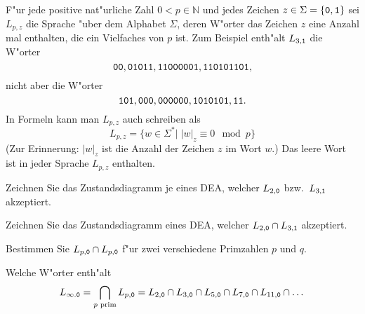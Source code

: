 F"ur jede positive nat"urliche Zahl $0<p\in\mathbb N$ und jedes Zeichen
$z\in \Sigma=\{\text{\tt 0},\text{\tt 1}\}$
sei $L_{p,z}$ die Sprache "uber dem Alphabet
$\Sigma$, deren W"orter das Zeichen $z$ eine Anzahl mal
enthalten, die ein Vielfaches von $p$ ist. Zum Beispiel enth"alt
$L_{3,\text{\tt 1}}$ die W"orter
\[
\text{\tt 00},
\text{\tt 01011},
\text{\tt 11000001},
\text{\tt 110101101},
\]
nicht aber die W"orter
\[
\text{\tt 101},
\text{\tt 000},
\text{\tt 000000},
\text{\tt 1010101},
\text{\tt 11}.
\]
In Formeln kann man $L_{p,z}$ auch schreiben als
\[
L_{p,z}=\{w\in\Sigma^*|\; |w|_z\equiv 0\mod p\}
\]
(Zur Erinnerung: $|w|_z$ ist die Anzahl der Zeichen $z$ im Wort $w$.)
Das leere Wort ist in jeder Sprache $L_{p,z}$ enthalten.
\begin{teilaufgaben}
\item Zeichnen Sie das Zustandsdiagramm je eines DEA, welcher
$L_{2,\text{\tt 0}}$ bzw.~$L_{3,\text{\tt 1}}$ akzeptiert.
\item Zeichnen Sie das Zustandsdiagramm eines DEA, welcher
$L_{2,\text{\tt 0}}\cap L_{3,\text{\tt 1}}$ akzeptiert.
\item
Bestimmen Sie
$L_{p,\text{\tt 0}} \cap L_{p,\text{\tt 0}}$
f"ur zwei verschiedene Primzahlen $p$ und $q$.
\item Welche W"orter enth"alt
\[
L_{\infty.\text{\tt 0}}
=
\bigcap_{\text{$p$ prim}}L_{p,\text{\tt 0}}
=
L_{2,\text{\tt 0}}\cap
L_{3,\text{\tt 0}}\cap
L_{5,\text{\tt 0}}\cap
L_{7,\text{\tt 0}}\cap
L_{11,\text{\tt 0}}\cap\dots
\]
\end{teilaufgaben}

